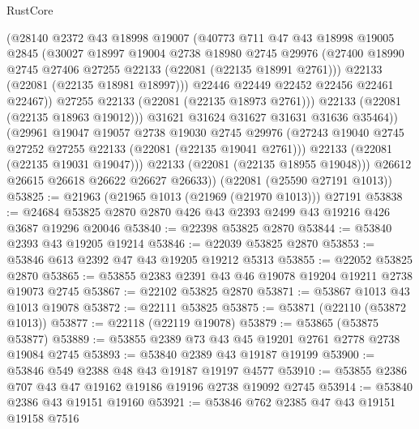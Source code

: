 \begin{lexlean}{RustCore}
\begin{coremodule}
                  (@28140
                    @2372
                    @43
                    @18998
                    @19007
                    (@40773
                      @711
                      @47
                      @43
                      @18998
                      @19005
                      @2845
                      (@30027
                        @18997
                        @19004
                        @2738
                        @18980
                        @2745
                        @29976
                        (@27400 @18990 @2745 @27406 @27255 @22133 (@22081 (@22135 @18991 @2761)))
                        @22133
                        (@22081 (@22135 @18981 @18997)))
                      @22446
                      @22449
                      @22452
                      @22456
                      @22461
                      @22467))
                  @27255
                  @22133
                  (@22081 (@22135 @18973 @2761)))
                @22133
                (@22081 (@22135 @18963 @19012)))
              @31621
              @31624
              @31627
              @31631
              @31636
              @35464))
          (@29961
            @19047
            @19057
            @2738
            @19030
            @2745
            @29976
            (@27243 @19040 @2745 @27252 @27255 @22133 (@22081 (@22135 @19041 @2761)))
            @22133
            (@22081 (@22135 @19031 @19047)))
          @22133
          (@22081 (@22135 @18955 @19048)))
        @26612
        @26615
        @26618
        @26622
        @26627
        @26633))
    (@22081 (@25590 @27191 @1013))
@53825 := @21963 (@21965 @1013 (@21969 (@21970 @1013))) @27191
@53838 := @24684 @53825 @2870 @2870 @426 @43 @2393 @2499 @43 @19216 @426 @3687 @19296 @20046
@53840 := @22398 @53825 @2870
@53844 := @53840 @2393 @43 @19205 @19214
@53846 := @22039 @53825 @2870
@53853 := @53846 @613 @2392 @47 @43 @19205 @19212 @5313
@53855 := @22052 @53825 @2870
@53865 := @53855 @2383 @2391 @43 @46 @19078 @19204 @19211 @2738 @19073 @2745
@53867 := @22102 @53825 @2870
@53871 := @53867 @1013 @43 @1013 @19078
@53872 := @22111 @53825
@53875 := @53871 (@22110 (@53872 @1013))
@53877 := @22118 (@22119 @19078)
@53879 := @53865 (@53875 @53877)
@53889 := @53855 @2389 @73 @43 @45 @19201 @2761 @2778 @2738 @19084 @2745
@53893 := @53840 @2389 @43 @19187 @19199
@53900 := @53846 @549 @2388 @48 @43 @19187 @19197 @4577
@53910 := @53855 @2386 @707 @43 @47 @19162 @19186 @19196 @2738 @19092 @2745
@53914 := @53840 @2386 @43 @19151 @19160
@53921 := @53846 @762 @2385 @47 @43 @19151 @19158 @7516

\end{coremodule}
\end{lexlean}

